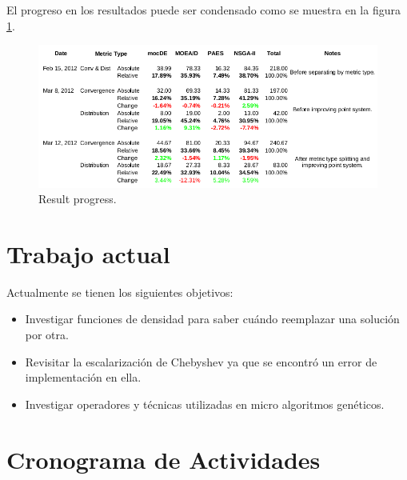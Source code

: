 \documentclass[english]{article}
\begin{document}

El progreso en los resultados puede ser condensado como se muestra en la figura \ref{fig:progress}.

\begin{figure}
\includegraphics[scale=0.6]{images/progress}
\caption{\label{fig:progress} Result progress.}
\end{figure}


\section*{Trabajo actual}

Actualmente se tienen los siguientes objetivos:
\begin{itemize}
\item Investigar funciones de densidad para saber cuándo reemplazar una solución por otra.
\item Revisitar la escalarización de Chebyshev ya que se encontró un error de implementación en ella.
\item Investigar operadores y técnicas utilizadas en micro algoritmos genéticos.
\end{itemize}

\section*{Cronograma de Actividades}
\end{document}
